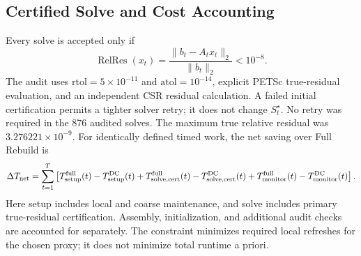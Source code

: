 \subsection{Certified Solve and Cost Accounting}
Every solve is accepted only if
\begin{equation}
\operatorname{RelRes}(x_t)=\frac{\|b_t-A_t x_t\|_2}{\|b_t\|_2}<10^{-8}.
\label{eq:rel_res}
\end{equation}
The audit uses $\mathrm{rtol}=5\times10^{-11}$ and
$\mathrm{atol}=10^{-14}$, explicit PETSc true-residual evaluation, and an
independent CSR residual calculation. A failed initial certification permits
a tighter solver retry; it does not change $S_t^\star$. No retry was required
in the 876 audited solves. The maximum true relative residual was
$3.276221\times10^{-9}$.
For identically defined timed work, the net saving over Full Rebuild is
\begin{equation}
\Delta T_{\rm net}=\sum_{t=1}^T
\left[T_{\rm setup}^{\rm full}(t)-T_{\rm setup}^{\rm DC}(t)
      +T_{\rm solve,cert}^{\rm full}(t)-T_{\rm solve,cert}^{\rm DC}(t)
      +T_{\rm monitor}^{\rm full}(t)-T_{\rm monitor}^{\rm DC}(t)\right].
\label{eq:cost_model}
\end{equation}
Here setup includes local and coarse maintenance, and solve includes primary
true-residual certification. Assembly, initialization, and additional audit
checks are accounted for separately. The constraint minimizes required local
refreshes for the chosen proxy; it does not minimize total runtime a priori.
